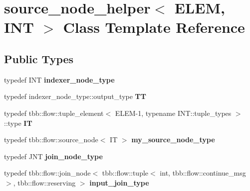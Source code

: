 \hypertarget{classsource__node__helper}{}\section{source\+\_\+node\+\_\+helper$<$ E\+L\+E\+M, I\+N\+T $>$ Class Template Reference}
\label{classsource__node__helper}
\subsection*{Public Types}
\begin{DoxyCompactItemize}
\item 
\hypertarget{classsource__node__helper_af8af587a7f5335fb5a2fbedaa8d50e2c}{}typedef I\+N\+T {\bfseries indexer\+\_\+node\+\_\+type}\label{classsource__node__helper_af8af587a7f5335fb5a2fbedaa8d50e2c}

\item 
\hypertarget{classsource__node__helper_a6ce1a17a13b4073b9230fc16d5b84806}{}typedef indexer\+\_\+node\+\_\+type\+::output\+\_\+type {\bfseries T\+T}\label{classsource__node__helper_a6ce1a17a13b4073b9230fc16d5b84806}

\item 
\hypertarget{classsource__node__helper_ab34f2edf570e7ef3b818d223fcd9226c}{}typedef tbb\+::flow\+::tuple\+\_\+element$<$ E\+L\+E\+M-\/1, typename I\+N\+T\+::tuple\+\_\+types $>$\+::type {\bfseries I\+T}\label{classsource__node__helper_ab34f2edf570e7ef3b818d223fcd9226c}

\item 
\hypertarget{classsource__node__helper_a6d10073fdfda6c2c25eccf3786aa1ee8}{}typedef tbb\+::flow\+::source\+\_\+node$<$ I\+T $>$ {\bfseries my\+\_\+source\+\_\+node\+\_\+type}\label{classsource__node__helper_a6d10073fdfda6c2c25eccf3786aa1ee8}

\item 
\hypertarget{classsource__node__helper_a89c771b6a5746f94e136fe6255c353a0}{}typedef J\+N\+T {\bfseries join\+\_\+node\+\_\+type}\label{classsource__node__helper_a89c771b6a5746f94e136fe6255c353a0}

\item 
\hypertarget{classsource__node__helper_aae50778abcc62a4f69e8d061a3b39973}{}typedef tbb\+::flow\+::join\+\_\+node$<$ tbb\+::flow\+::tuple$<$ int, tbb\+::flow\+::continue\+\_\+msg $>$, tbb\+::flow\+::reserving $>$ {\bfseries input\+\_\+join\+\_\+type}\label{classsource__node__helper_aae50778abcc62a4f69e8d061a3b39973}


\end{DoxyCompactItemize}
